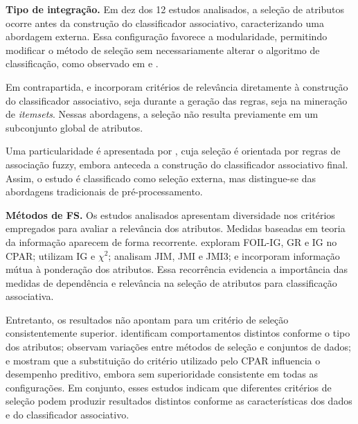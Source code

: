 \noindent\textbf{Tipo de integração.} Em dez dos 12 estudos analisados, a seleção de atributos ocorre antes da construção do classificador associativo, caracterizando uma abordagem externa. Essa configuração favorece a modularidade, permitindo modificar o método de seleção sem necessariamente alterar o algoritmo de classificação, como observado em  e .

Em contrapartida,  e  incorporam critérios de relevância diretamente à construção do classificador associativo, seja durante a geração das regras, seja na mineração de \textit{itemsets}. Nessas abordagens, a seleção não resulta previamente em um subconjunto global de atributos.

Uma particularidade é apresentada por , cuja seleção é orientada por regras de associação fuzzy, embora anteceda a construção do classificador associativo final. Assim, o estudo é classificado como seleção externa, mas distingue-se das abordagens tradicionais de pré-processamento.

\noindent\textbf{Métodos de FS.} Os estudos analisados apresentam diversidade nos critérios empregados para avaliar a relevância dos atributos. Medidas baseadas em teoria da informação aparecem de forma recorrente.  exploram FOIL-IG, GR e IG no CPAR;  utilizam IG e $\chi^2$;  analisam JIM, JMI e JMI3; e  incorporam informação mútua à ponderação dos atributos. Essa recorrência evidencia a importância das medidas de dependência e relevância na seleção de atributos para classificação associativa.

Entretanto, os resultados não apontam para um critério de seleção consistentemente superior.  identificam comportamentos distintos conforme o tipo dos atributos;  observam variações entre métodos de seleção e conjuntos de dados; e  mostram que a substituição do critério utilizado pelo CPAR influencia o desempenho preditivo, embora sem superioridade consistente em todas as configurações. Em conjunto, esses estudos indicam que diferentes critérios de seleção podem produzir resultados distintos conforme as características dos dados e do classificador associativo.

